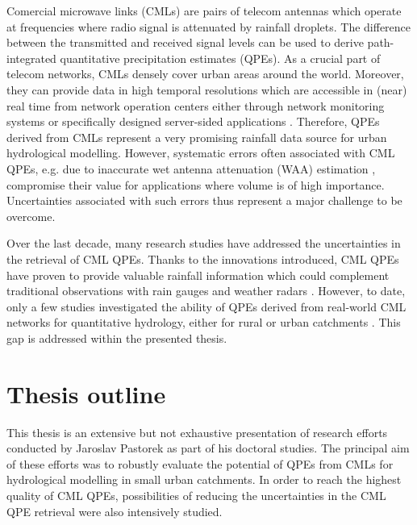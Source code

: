 \documentclass{ctuthesis}\usepackage[]{graphicx}\usepackage[]{color}
\begin{document}
Comercial microwave links (CMLs) are pairs of telecom antennas which operate at frequencies where radio signal is attenuated by rainfall droplets. The difference between the transmitted and received signal levels can be used to derive path-integrated quantitative precipitation estimates (QPEs). As a crucial part of telecom networks, CMLs densely cover urban areas around the world. Moreover, they can provide data in high temporal resolutions which are accessible in (near) real time from network operation centers either through network monitoring systems or specifically designed server-sided applications \citep{chwalaRealtimeDataAcquisition2016}. Therefore, QPEs derived from CMLs represent a very promising rainfall data source for urban hydrological modelling. However, systematic errors often associated with CML QPEs, e.g. due to inaccurate wet antenna attenuation (WAA) estimation \citep{leijnseMicrowaveLinkRainfall2008, fenclGaugeadjustedRainfallEstimates2017}, compromise their value for applications where volume is of high importance. Uncertainties associated with such errors thus represent a major challenge to be overcome.

Over the last decade, many research studies have addressed the uncertainties in the retrieval of CML QPEs. Thanks to the innovations introduced, CML QPEs have proven to provide valuable rainfall information which could complement traditional observations with rain gauges and weather radars \citep{chwalaCommercialMicrowaveLink2019, gossetImprovingRainfallMeasurement2016, imhoffRainfallNowcastingUsing2020, riosgaonaRainfallRetrievalCommercial2018, uijlenhoetOpportunisticRemoteSensing2018}. However, to date, only a few studies investigated the ability of QPEs derived from real-world CML networks for quantitative hydrology, either for rural \citep{brauerEffectDifferencesRainfall2016, cazzanigaCalculatingHydrologicalResponse2020, smiatekPotentialCommercialMicrowave2017} or urban catchments \citep{dischImpactDifferentSources2019, stranskyRunoffPredictionUsing2018}. This gap is addressed within the presented thesis.


\section{Thesis outline}
This thesis is an extensive but not exhaustive presentation of research efforts conducted by Jaroslav Pastorek as part of his doctoral studies. The principal aim of these efforts was to robustly evaluate the potential of QPEs from CMLs for hydrological modelling in small urban catchments. In order to reach the highest quality of CML QPEs, possibilities of reducing the uncertainties in the CML QPE retrieval were also intensively studied.
\end{document}
